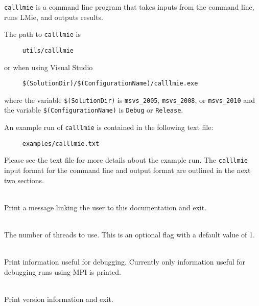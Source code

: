 %
\label{lmie_command_line_program_calllmie}

\texttt{calllmie} is a command line program that takes inputs from the command line, runs LMie, and outputs results.

\noindent
The path to \texttt{calllmie} is 
\begin{verbatim}
     utils/calllmie
\end{verbatim}
or when using Visual Studio
\begin{verbatim}
     $(SolutionDir)/$(ConfigurationName)/calllmie.exe
\end{verbatim}
where the variable \texttt{\$(SolutionDir)} is \texttt{msvs\_2005}, \texttt{msvs\_2008}, or \texttt{msvs\_2010} and the variable \texttt{\$(ConfigurationName)} is \texttt{Debug} or \texttt{Release}.

\noindent
An example run of \texttt{calllmie} is contained in the following text file:
\begin{verbatim}
     examples/calllmie.txt
\end{verbatim}
Please see the text file for more details about the example run.  The \texttt{calllmie} input format for the command line and output format are outlined in the next two sections.


\label{lmie_command_line_program_calllmie_calllmie_input_format}


\label{lmie_command_line_program_calllmie_calllmie_input_format_general_flags}

\begin{description}

\item[\texttt{-help}] \hfill \\
Print a message linking the user to this documentation and exit.

\item[\texttt{-n\_threads <n\_threads>}] \hfill \\
The number of threads to use.  This is an optional flag with a default value of 1.


\item[\texttt{-verbose}] \hfill \\
Print information useful for debugging.  Currently only information useful for debugging runs using MPI is printed.

\item[\texttt{-version}] \hfill \\
Print version information and exit.

\end{description}


